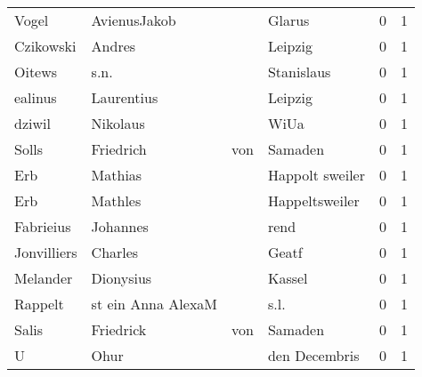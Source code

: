 \begin{tabular}{llllrr}
                    Vogel &                       AvienusJakob &             &                                      Glarus &          0 &         1 \\
                Czikowski &                             Andres &             &                                     Leipzig &          0 &         1 \\
                   Oitews &                               s.n. &             &                                  Stanislaus &          0 &         1 \\
                  ealinus &                         Laurentius &             &                                     Leipzig &          0 &         1 \\
                   dziwil &                           Nikolaus &             &                                        WiUa &          0 &         1 \\
                    Solls &                          Friedrich &         von &                                     Samaden &          0 &         1 \\
                      Erb &                            Mathias &             &                             Happolt sweiler &          0 &         1 \\
                      Erb &                            Mathles &             &                              Happeltsweiler &          0 &         1 \\
                Fabrieius &                           Johannes &             &                                        rend &          0 &         1 \\
              Jonvilliers &                            Charles &             &                                       Geatf &          0 &         1 \\
                 Melander &                          Dionysius &             &                                      Kassel &          0 &         1 \\
                  Rappelt &                 st ein Anna AlexaM &             &                                        s.l. &          0 &         1 \\
                    Salis &                          Friedrick &         von &                                     Samaden &          0 &         1 \\
                        U &                               Ohur &             &                               den Decembris &          0 &         1 \\

\end{tabular}
